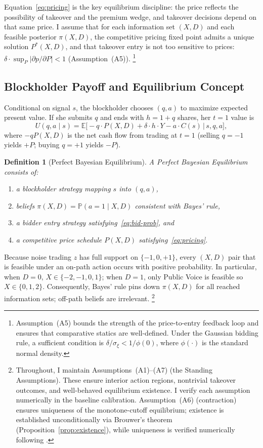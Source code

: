 \documentclass[11pt]{article}
\newtheorem{definition}{Definition}
\newcommand{\E}{\mathbb{E}}
\newcommand{\PP}{\mathbb{P}}
\newcommand{\1}{\mathbf{1}}
\begin{document}
Equation~\eqref{eq:pricing} is the key equilibrium discipline: the price reflects the possibility of takeover and the premium wedge, and takeover decisions depend on that same price. I assume that for each information set $(X,D)$ and each feasible posterior $\pi(X,D)$, the competitive pricing fixed point admits a unique solution $P^*(X,D)$, and that takeover entry is not too sensitive to prices: $\delta\cdot\sup_P|\partial p/\partial P|<1$ (Assumption~\textup{(A5)}).%
\footnote{Assumption~\textup{(A5)} bounds the strength of the price-to-entry feedback loop and ensures that comparative statics are well-defined. Under the Gaussian bidding rule, a sufficient condition is $\delta/\sigma_\xi < 1/\phi(0)$, where $\phi(\cdot)$ is the standard normal density.}

%
\subsection{Blockholder Payoff and Equilibrium Concept}
%

Conditional on signal $s$, the blockholder chooses $(q, a)$ to maximize expected present value. If she submits $q$ and ends with $h = 1 + q$ shares, her $t = 1$ value is
\[
U(q, a \mid s) = \E\Big[-q \cdot P(X,D) + \delta \cdot h \cdot Y - a \cdot C(s) \,\Big|\, s, q, a\Big],
\]
where $-qP(X,D)$ is the net cash flow from trading at $t = 1$ (selling $q = -1$ yields $+P$; buying $q = +1$ yields $-P$).

\begin{definition}[Perfect Bayesian Equilibrium]
A \emph{Perfect Bayesian Equilibrium} consists of:
\begin{enumerate}[label=(\roman{enumi})]
\item a blockholder strategy mapping $s$ into $(q, a)$,
\item beliefs $\pi(X,D) = \PP(a = 1 \mid X, D)$ consistent with Bayes' rule,
\item a bidder entry strategy satisfying~\eqref{eq:bid-prob}, and
\item a competitive price schedule $P(X,D)$ satisfying~\eqref{eq:pricing}.
\end{enumerate}
\end{definition}

Because noise trading $z$ has full support on $\{-1,0,+1\}$, every $(X,D)$ pair that is feasible under an on-path action occurs with positive probability. In particular, when $D=0$, $X\in\{-2,-1,0,1\}$; when $D=1$, only Public Voice is feasible so $X\in\{0,1,2\}$. Consequently, Bayes' rule pins down $\pi(X,D)$ for all reached information sets; off-path beliefs are irrelevant.%
\footnote{Throughout, I maintain Assumptions~\textup{(A1)}--\textup{(A7)} (the Standing Assumptions). These ensure interior action regions, nontrivial takeover outcomes, and well-behaved equilibrium existence. I verify each assumption numerically in the baseline calibration. Assumption~\textup{(A6)} (contraction) ensures uniqueness of the monotone-cutoff equilibrium; existence is established unconditionally via Brouwer's theorem (Proposition~\ref{prop:existence}), while uniqueness is verified numerically following \citet{EdmansGoldsteinJiang2015}.}
\end{document}
